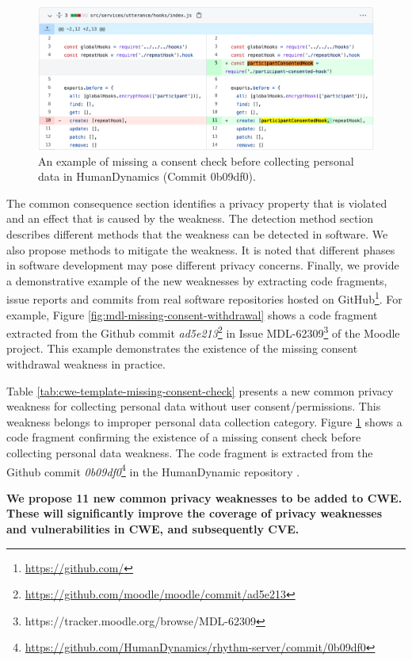 \begin{figure}[ht]
	\centering
	\includegraphics[width=1.0\linewidth]{figures/hd-missing-consent-check}
	\caption{An example of missing a consent check before collecting personal data in HumanDynamics (Commit 0b09df0).}
	\label{fig:hd-missing-consent-check}
\end{figure}

The common consequence section identifies a privacy property that is violated and an effect that is caused by the weakness. The detection method section describes different methods that the weakness can be detected in software. We also propose methods to mitigate the weakness. It is noted that different phases in software development may pose different privacy concerns. Finally, we provide a demonstrative example of the new weaknesses by extracting code fragments, issue reports and commits from real software repositories hosted on GitHub\footnote{\url{https://github.com/}}.  For example, Figure \ref{fig:mdl-missing-consent-withdrawal} shows a code fragment extracted from the Github commit \emph{ad5e213}\footnote{\url{https://github.com/moodle/moodle/commit/ad5e213}} in Issue MDL-62309\footnote{https://tracker.moodle.org/browse/MDL-62309} of the Moodle project. This example demonstrates the existence of the missing consent withdrawal weakness in practice.

Table \ref{tab:cwe-template-missing-consent-check} presents a new common privacy weakness for collecting personal data without user consent/permissions. This weakness belongs to improper personal data collection category. Figure \ref{fig:hd-missing-consent-check} shows a code fragment confirming the existence of a missing consent check before collecting personal data weakness. The code fragment is extracted from the Github commit \emph{0b09df0}\footnote{\url{https://github.com/HumanDynamics/rhythm-server/commit/0b09df0}} in the HumanDynamic repository \cite{HumanDynamics}.

\begin{conclusion}
	\textbf{We propose 11 new common privacy weaknesses to be added to CWE. These will significantly improve the coverage of privacy weaknesses and vulnerabilities in CWE, and subsequently CVE.}
\end{conclusion}

